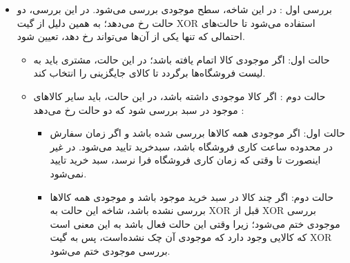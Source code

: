 \documentclass[14pt]{article}
\begin{document}
\begin{flushright}
\begin{itemize}
\item بررسی اول : در این شاخه، سطح موجودی بررسی می‌شود. در این بررسی، دو حالت رخ می‌دهد؛ به همین دلیل از گیت XOR  استفاده می‌شود تا حالت‌های احتمالی که تنها یکی از آن‌ها می‌تواند رخ دهد، تعیین شود.

\begin{flushright}
\begin{itemize}
\item حالت اول: اگر موجودی کالا اتمام یافته باشد؛ در این حالت، مشتری باید به لیست فروشگاه‌ها برگردد تا کالای جایگزینی را انتخاب کند. 
\item حالت دوم : اگر کالا موجودی داشته باشد، در این حالت، باید سایر کالاهای موجود در سبد بررسی شود که دو حالت رخ می‌دهد :
\begin{flushright}
\begin{itemize}
\item حالت اول: اگر موجودی همه کالا‌ها بررسی شده باشد و اگر زمان سفارش در محدوده ساعت کاری فروشگاه باشد، سبدخرید تایید می‌شود. در غیر اینصورت تا وقتی که زمان کاری فروشگاه فرا نرسد، سبد خرید تایید نمی‌شود.
\item حالت دوم: اگر چند کالا در سبد خرید موجود باشد و موجودی همه کالاها بررسی نشده باشد، شاخه این حالت به XOR قبل از XOR بررسی موجودی ختم می‌شود؛ زیرا وقتی این حالت فعال باشد به این معنی است که کالایی وجود دارد که موجودی آن چک نشده‌است، پس به گیت XOR بررسی موجودی ختم می‌شود.
\end{itemize}
\end{flushright}
\end{itemize}
\end{flushright}
\end{itemize}
\end{flushright}
\end{document}
